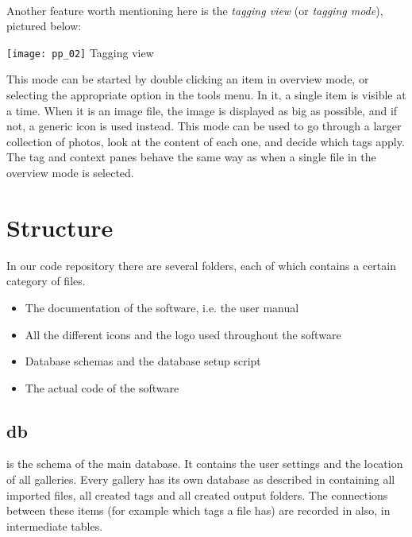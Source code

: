 \paragraph{}
Another feature worth mentioning here is the \textit{tagging view} (or \textit{tagging mode}), pictured below:

\begin{center}
	\texttt{[image: pp\_02]}
	\small{Tagging view}
\end{center}

This mode can be started by double clicking an item in overview mode, or selecting the appropriate option in the tools menu. In it, a single item is visible at a time. When it is an image file, the image is displayed as big as possible, and if not, a generic icon is used instead. This mode can be used to go through a larger collection of photos, look at the content of each one, and decide which tags apply. The tag and context panes behave the same way as when a single file in the overview mode is selected.




\section{Structure}
\def \kapitelautor {Clemens Stadlbauer} 

In our code repository there are several folders, each of which contains a
certain category of files.

\begin{itemize}
	\item[\tfpath{doc/}] The documentation of the software, i.e. the user manual
	\item[\tfpath{icons/}] All the different icons and the logo used throughout the
	software
	\item[\tfpath{db/}] Database schemas and the database setup script
	\item[\tfpath{src/}] The actual code of the software
\end{itemize}

\subsection{db}
 is the schema of the main database. It contains the user
settings and the location of all galleries. Every gallery has its own
database as described in  containing all imported files,
all created tags and all created output folders. The connections between these
items (for example which tags a file has) are recorded in also,
in intermediate tables.

